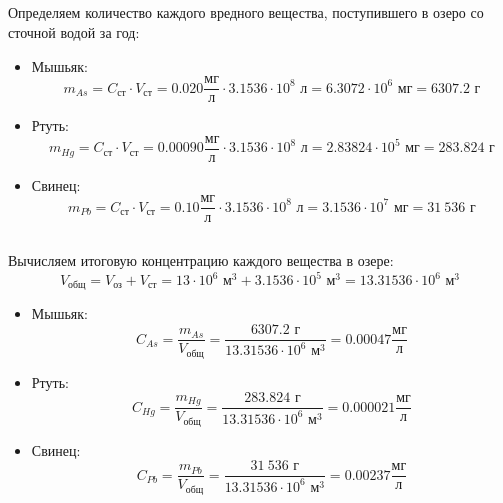 \subsection*{  }
Определяем количество каждого вредного вещества, поступившего в озеро со сточной водой за год:

\begin{itemize}
    \item Мышьяк:
          $$
              m_{As} = C_{ст} \cdot V_{ст} = 0.020 \frac{\text{мг}}{\text{л}} \cdot 3.1536 \cdot 10^8 \text{ л} = 6.3072 \cdot 10^6 \text{ мг} = 6307.2 \text{ г}
          $$

    \item Ртуть:
          $$
              m_{Hg} = C_{ст} \cdot V_{ст} = 0.00090 \frac{\text{мг}}{\text{л}} \cdot 3.1536 \cdot 10^8 \text{ л} = 2.83824 \cdot 10^5 \text{ мг} = 283.824 \text{ г}
          $$

    \item Свинец:
          $$
              m_{Pb} = C_{ст} \cdot V_{ст} = 0.10 \frac{\text{мг}}{\text{л}} \cdot 3.1536 \cdot 10^8 \text{ л} = 3.1536 \cdot 10^7 \text{ мг} = 31~536 \text{ г}
          $$
\end{itemize}

\subsection*{  }
Вычисляем итоговую концентрацию каждого вещества в озере:
$$
    V_\text{общ} = V_\text{оз} + V_\text{ст} = 13 \cdot 10^6 \text{ м}^3 + 3.1536 \cdot 10^5 \text{ м}^3 = 13.31536 \cdot 10^6 \text{ м}^3
$$
\begin{itemize}
    \item Мышьяк:
          $$
              C_{As} = \frac{m_{As}}{V_\text{общ}} = \frac{6307.2 \text{ г}}{13.31536 \cdot 10^6 \text{ м}^3} = 0.00047 \frac{\text{мг}}{\text{л}}
          $$

    \item Ртуть:
          $$
              C_{Hg} = \frac{m_{Hg}}{V_\text{общ}} = \frac{283.824 \text{ г}}{13.31536 \cdot 10^6 \text{ м}^3} = 0.000021 \frac{\text{мг}}{\text{л}}
          $$

    \item Свинец:
          $$
              C_{Pb} = \frac{m_{Pb}}{V_\text{общ}} = \frac{31~536 \text{ г}}{13.31536 \cdot 10^6 \text{ м}^3} = 0.00237 \frac{\text{мг}}{\text{л}}
          $$
\end{itemize}

